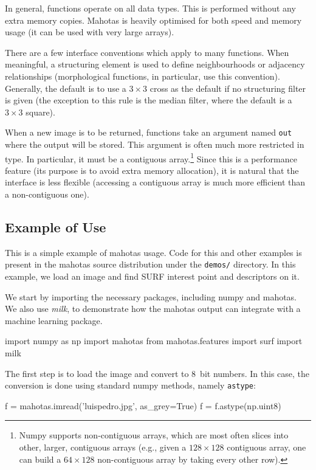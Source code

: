 \documentclass{scrartcl}
\let\code\texttt
\begin{document}
In general, functions operate on all data types. This is performed without any
extra memory copies. Mahotas is heavily optimised for both speed and memory
usage (it can be used with very large arrays).

There are a few interface conventions which apply to many functions. When
meaningful, a structuring element is used to define neighbourhoods or adjacency
relationships (morphological functions, in particular, use this convention).
Generally, the default is to use a $3 \times 3$ cross as the default if no
structuring filter is given (the exception to this rule is the median filter,
where the default is a $3 \times 3$ square).

When a new image is to be returned, functions take an argument named \code{out}
where the output will be stored. This argument is often much more restricted in
type. In particular, it must be a contiguous array.\footnote{Numpy supports
non-contiguous arrays, which are most often slices into other, larger,
contiguous arrays (e.g., given a $128 \times 128$ contiguous array, one can
build a $64 \times 128$ non-contiguous array by taking every other row).} Since
this is a performance feature (its purpose is to avoid extra memory
allocation), it is natural that the interface is less flexible (accessing a
contiguous array is much more efficient than a non-contiguous one).

\subsection{Example of Use}

This is a simple example of mahotas usage. Code for this and other examples is
present in the mahotas source distribution under the \texttt{demos/} directory.
In this example, we load an image and find SURF interest point and descriptors
on it.

We start by importing the necessary packages, including numpy and mahotas. We
also use \textit{milk}, to demonstrate how the mahotas output can integrate
with a machine learning package.

\begin{python}
import numpy as np
import mahotas
from mahotas.features import surf
import milk
\end{python}

The first step is to load the image and convert to 8~bit numbers. In this
case, the conversion is done using standard numpy methods, namely
\code{astype}:

\begin{python}
f = mahotas.imread('luispedro.jpg', as_grey=True)
f = f.astype(np.uint8)
\end{python}
\end{document}
